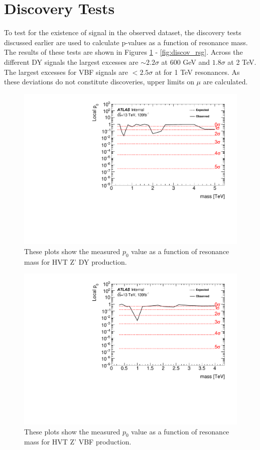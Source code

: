 \section{Discovery Tests}
To test for the existence of signal in the observed dataset, the discovery tests discussed earlier are used to calculate p-values as a function of resonance mass. The results of these tests are shown in Figures \ref{fig:discov_hvtww} - \ref{fig:discov_rsg}. Across the different DY signals the largest excesses are $\sim 2.2\sigma$ at 600 GeV and $1.8\sigma$ at 2 TeV. The largest excesses for VBF signals are $< 2.5\sigma$ at for 1 TeV resonances. As these deviations do not constitute discoveries, upper limits on $\mu$ are calculated.
 \begin{figure}[h!]
  \centering
  \includegraphics[width=\hsize]{figures/results/pvalues/fixed_pvalues/hvtww_pvalue.pdf}
 \caption{These plots show the measured $p_{0}$ value as a function of resonance mass for HVT Z' DY production.} 
  \label{fig:discov_hvtww}
\end{figure} 
\FloatBarrier

\begin{figure}[h!]
  \centering
  \includegraphics[width=\hsize]{figures/results/pvalues/fixed_pvalues/hvtwwvbf_pvalue.pdf}
 \caption{These plots show the measured $p_{0}$ value as a function of resonance mass for HVT Z' VBF production.} 
  \label{fig:discov_hvtwwvbf}
\end{figure} 
\FloatBarrier


